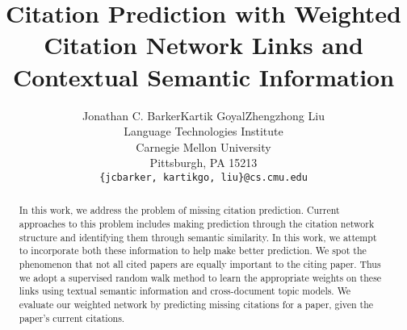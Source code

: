 \documentclass{article} %
\title{Citation Prediction with Weighted Citation Network Links and Contextual Semantic Information}
\author{
Jonathan C. Barker\tab Kartik Goyal\tab Zhengzhong Liu \\
Language Technologies Institute \\
Carnegie Mellon University \\
Pittsburgh, PA 15213 \\
\texttt{\{jcbarker, kartikgo, liu\}@cs.cmu.edu} \\
}
\begin{document}
\maketitle

\begin{abstract}
 In this work, we address the problem of missing citation prediction. Current approaches to this problem includes making prediction through the citation network structure and identifying them through semantic similarity. In this work, we attempt to incorporate both these information to help make better prediction. We spot the phenomenon that not all cited papers are equally important to the citing paper. Thus we adopt a supervised random walk method to learn the appropriate weights on these links using textual semantic information and cross-document topic models. We evaluate our weighted network by predicting missing citations for a paper, given the paper's current citations.
\end{abstract}
\end{document}
